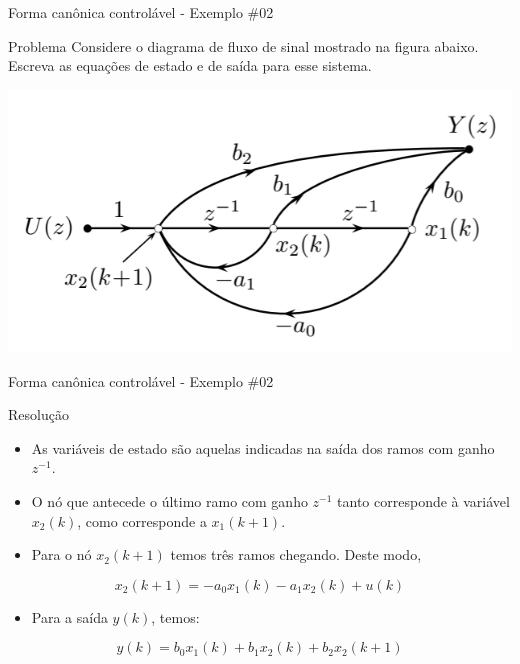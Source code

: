 \begin{frame}{Forma canônica controlável - Exemplo \#02}
\begin{block}{Problema}
Considere o diagrama de fluxo de sinal mostrado na figura abaixo. Escreva as equações de estado e de saída para esse sistema.
\end{block}
\centerline{\includegraphics[width=0.73\linewidth]{Figuras/Ch14/fig6.PNG}}
\end{frame}

\begin{frame}{Forma canônica controlável - Exemplo \#02}
\begin{block}{Resolução}
\begin{itemize}
    \item As variáveis de estado são aquelas indicadas na saída dos ramos com ganho $z^{-1}$. 
    \item O nó que antecede o último ramo com ganho $z^{-1}$ tanto corresponde à variável $x_2(k)$, como corresponde a $x_1(k+1)$.
    \item Para o nó $x_2(k+1)$ temos três ramos chegando. Deste modo,
\end{itemize}

$$x_2(k+1) = -a_0 x_1(k) -a_1 x_2(k) + u(k)$$
\vspace{-0.2cm}
\begin{itemize}
    \item Para a saída $y(k)$, temos:
\end{itemize}

$$y(k) = b_0 x_1(k) + b_1 x_2(k) + b_2x_2(k+1)$$
\end{block}
\end{frame}

